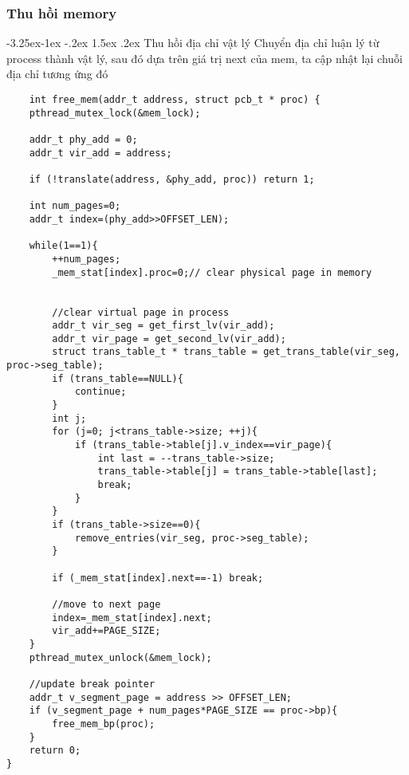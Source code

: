 \documentclass[10pt]{article}
\makeatletter
\newcommand\tab[1][1cm]{\hspace*{#1}}
\newcounter {subsubsubsection}[subsubsection]
\newcommand\subsubsubsection{\@startsection{subsubsubsection}{4}{\z@}%
                                     {-3.25ex\@plus -1ex \@minus -.2ex}%
                                     {1.5ex \@plus .2ex}%
                                     {\normalfont\normalsize\bfseries}}
\makeatother
\begin{document}
\subsubsection{Thu hồi memory}
\subsubsubsection{Thu hồi địa chỉ vật lý}
\tab[0.5cm] Chuyển địa chỉ luận lý từ process thành vật lý, sau đó dựa trên giá trị next của mem, ta cập nhật lại chuỗi địa chỉ tương ứng đó\\
\begin{lstlisting}
    int free_mem(addr_t address, struct pcb_t * proc) {
    pthread_mutex_lock(&mem_lock);
    
    addr_t phy_add = 0;
    addr_t vir_add = address;
    
    if (!translate(address, &phy_add, proc)) return 1;
    
    int num_pages=0;
    addr_t index=(phy_add>>OFFSET_LEN);
    
    while(1==1){
        ++num_pages;
        _mem_stat[index].proc=0;// clear physical page in memory
        

        //clear virtual page in process
        addr_t vir_seg = get_first_lv(vir_add);
        addr_t vir_page = get_second_lv(vir_add);
        struct trans_table_t * trans_table = get_trans_table(vir_seg, proc->seg_table);
        if (trans_table==NULL){
            continue;
        }
        int j;
        for (j=0; j<trans_table->size; ++j){
            if (trans_table->table[j].v_index==vir_page){
                int last = --trans_table->size;
                trans_table->table[j] = trans_table->table[last];
                break;
            }
        }
        if (trans_table->size==0){
            remove_entries(vir_seg, proc->seg_table);
        }

        if (_mem_stat[index].next==-1) break;

        //move to next page
        index=_mem_stat[index].next;
        vir_add+=PAGE_SIZE;
    }
    pthread_mutex_unlock(&mem_lock);

    //update break pointer 
    addr_t v_segment_page = address >> OFFSET_LEN;
    if (v_segment_page + num_pages*PAGE_SIZE == proc->bp){
        free_mem_bp(proc);
    }
    return 0;
}

\end{lstlisting}
\end{document}
